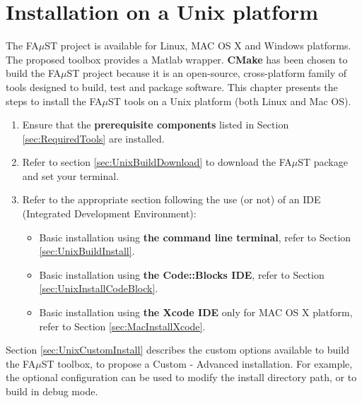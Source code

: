 \chapter{Installation on a Unix platform}\label{sec:InstallUnix}

The FA$\mu$ST project is available for Linux, MAC OS X and Windows platforms. The proposed toolbox provides a Matlab wrapper. \textbf{CMake} has been chosen to build the FA$\mu$ST project because it is an open-source, cross-platform family of tools designed to build, test and package software. This chapter presents the steps to install the FA$\mu$ST tools on a Unix platform (both Linux and Mac OS).

\begin{enumerate}
\item Ensure that the \textbf{prerequisite components} listed in Section \ref{sec:RequiredTools} are installed.

\item Refer to section \ref{sec:UnixBuildDownload} to download the FA$\mu$ST package and set your terminal. 

\item Refer to the appropriate section following the use (or not) of an IDE (Integrated Development Environment): 
\begin{itemize}
\item Basic installation using \textbf{the command line terminal}, refer to Section \ref{sec:UnixBuildInstall}.
\item Basic installation using \textbf{the Code::Blocks IDE}, refer to Section \ref{sec:UnixInstallCodeBlock}. 
\item Basic installation using \textbf{the Xcode IDE } only for MAC OS X platform, refer to Section \ref{sec:MacInstallXcode}. 
\end{itemize}
\end{enumerate}

Section \ref{sec:UnixCustomInstall} describes the custom options available to build the FA$\mu$ST toolbox, to propose a Custom - Advanced installation. For example, the optional configuration can be used to modify the install directory path, or to build in debug mode.  

